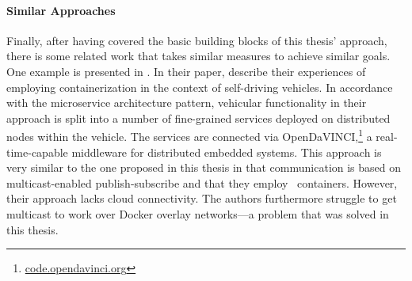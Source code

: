 \paragraph{Similar Approaches}
Finally, after having covered the basic building blocks of this thesis' approach, there is some related work that takes similar measures to achieve similar goals.
One example is presented in \cite{berger2017containerized}. In their paper, \citeauthor*{berger2017containerized} describe their experiences of employing containerization in the context of self-driving vehicles.
In accordance with the microservice architecture pattern, vehicular functionality in their approach is split into a number of fine-grained services deployed on distributed nodes within the vehicle. The services are connected via OpenDaVINCI,\footnote{\url{code.opendavinci.org}} a real-time-capable middleware for distributed embedded systems. This approach is very similar to the one proposed in this thesis in that communication is based on multicast-enabled publish-subscribe and that they employ \docker\ containers. However, their approach lacks cloud connectivity. The authors furthermore struggle to get multicast to work over Docker overlay networks---a problem that was solved in this thesis.

